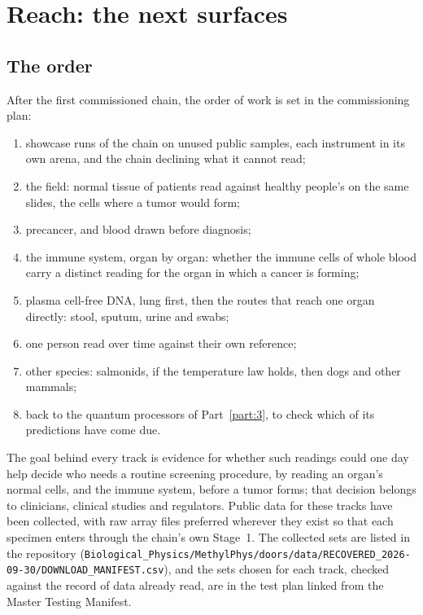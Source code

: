 \chapter{Reach: the next surfaces}\label{part4:ch:reach}

\section{The order}

After the first commissioned chain, the order of work is set in the commissioning plan:
\begin{enumerate}
\item showcase runs of the chain on unused public samples, each instrument in its own arena, and the chain declining what it cannot read;
\item the field: normal tissue of patients read against healthy people's on the same slides, the cells where a tumor would form;
\item precancer, and blood drawn before diagnosis;
\item the immune system, organ by organ: whether the immune cells of whole blood carry a distinct reading for the organ in which a cancer is forming;
\item plasma cell-free DNA, lung first, then the routes that reach one organ directly: stool, sputum, urine and swabs;
\item one person read over time against their own reference;
\item other species: salmonids, if the temperature law holds, then dogs and other mammals;
\item back to the quantum processors of Part~\ref{part:3}, to check which of its predictions have come due.
\end{enumerate}
The goal behind every track is evidence for whether such readings could one day help decide who needs a routine screening procedure, by reading an
organ's normal cells, and the immune system, before a tumor forms; that decision belongs to clinicians, clinical studies and regulators.
Public data for these tracks have been collected, with raw array files preferred wherever they exist so that each specimen enters through the chain's own
Stage~1. The collected sets are listed in the repository (\texttt{Biological\_Physics/MethylPhys/doors/data/RECOVERED\_2026-09-30/DOWNLOAD\_MANIFEST.csv}), and the sets chosen for each track, checked against the record of data already read, are in the test plan linked from the Master Testing Manifest.


